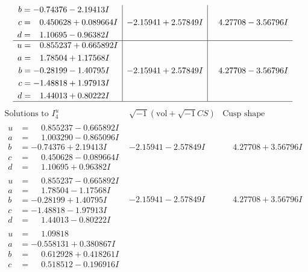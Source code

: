 \documentclass[1p]{elsarticle_modified}
\theoremstyle{definition}
\newcommand{\I}{\sqrt{-1}}
\begin{document}
$$\begin{array}{c|c|c}
\begin{aligned}
b &= -0.74376 - 2.19413 I \\
c &= \phantom{-}0.450628 + 0.089664 I \\
d &= \phantom{-}1.10695 - 0.96382 I\end{aligned}
 & -2.15941 + 2.57849 I & \phantom{-}4.27708 - 3.56796 I \\ \hline\begin{aligned}
u &= \phantom{-}0.855237 + 0.665892 I \\
a &= \phantom{-}1.78504 + 1.17568 I \\
b &= -0.28199 - 1.40795 I \\
c &= -1.48818 + 1.97913 I \\
d &= \phantom{-}1.44013 + 0.80222 I\end{aligned}
 & -2.15941 + 2.57849 I & \phantom{-}4.27708 - 3.56796 I\\
 \hline 
 \end{array}$$\newpage$$\begin{array}{c|c|c}  
\text{Solutions to }I^u_{4}& \I (\text{vol} + \sqrt{-1}CS) & \text{Cusp shape}\\
 \hline 
\begin{aligned}
u &= \phantom{-}0.855237 - 0.665892 I \\
a &= \phantom{-}1.003290 - 0.865096 I \\
b &= -0.74376 + 2.19413 I \\
c &= \phantom{-}0.450628 - 0.089664 I \\
d &= \phantom{-}1.10695 + 0.96382 I\end{aligned}
 & -2.15941 - 2.57849 I & \phantom{-}4.27708 + 3.56796 I \\ \hline\begin{aligned}
u &= \phantom{-}0.855237 - 0.665892 I \\
a &= \phantom{-}1.78504 - 1.17568 I \\
b &= -0.28199 + 1.40795 I \\
c &= -1.48818 - 1.97913 I \\
d &= \phantom{-}1.44013 - 0.80222 I\end{aligned}
 & -2.15941 - 2.57849 I & \phantom{-}4.27708 + 3.56796 I \\ \hline\begin{aligned}
u &= \phantom{-}1.09818\phantom{ +0.000000I} \\
a &= -0.558131 + 0.380867 I \\
b &= \phantom{-}0.612928 + 0.418261 I \\
c &= \phantom{-}0.518512 - 0.196916 I \\

\end{aligned}
\end{array}$$
\end{document}
